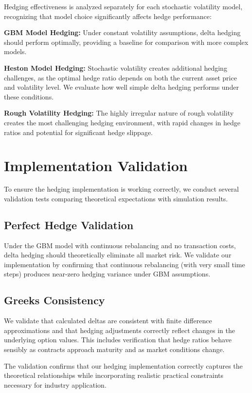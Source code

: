 \documentclass[12pt,a4paper]{report}
\begin{document}
Hedging effectiveness is analyzed separately for each stochastic volatility model, recognizing that model choice significantly affects hedge performance:

\textbf{GBM Model Hedging:} Under constant volatility assumptions, delta hedging should perform optimally, providing a baseline for comparison with more complex models.

\textbf{Heston Model Hedging:} Stochastic volatility creates additional hedging challenges, as the optimal hedge ratio depends on both the current asset price and volatility level. We evaluate how well simple delta hedging performs under these conditions.

\textbf{Rough Volatility Hedging:} The highly irregular nature of rough volatility creates the most challenging hedging environment, with rapid changes in hedge ratios and potential for significant hedge slippage.

\section{Implementation Validation}

To ensure the hedging implementation is working correctly, we conduct several validation tests comparing theoretical expectations with simulation results.

\subsection{Perfect Hedge Validation}

Under the GBM model with continuous rebalancing and no transaction costs, delta hedging should theoretically eliminate all market risk. We validate our implementation by confirming that continuous rebalancing (with very small time steps) produces near-zero hedging variance under GBM assumptions.

\subsection{Greeks Consistency}

We validate that calculated deltas are consistent with finite difference approximations and that hedging adjustments correctly reflect changes in the underlying option values. This includes verification that hedge ratios behave sensibly as contracts approach maturity and as market conditions change.

The validation confirms that our hedging implementation correctly captures the theoretical relationships while incorporating realistic practical constraints necessary for industry application.
\end{document}
